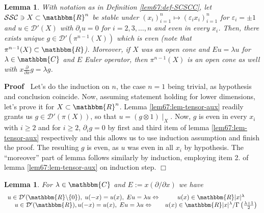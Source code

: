 \documentclass{article}
\newcommand{\assign}{:=}
\renewenvironment{proof}{\noindent\textbf{Proof\ }}{\hspace*{\fill}$\Box$\medskip}
\newtheorem{lemma}[proposition]{Lemma}
\theoremstyle{remark}
\begin{document}
\begin{lemma}
	\label{lem67:lem-tensor}With notation as in Definition \ref{lem67:def-SCSCC}, let $\mathcal{S}\mathcal{S}\mathcal{C} \ni X \subset
  \mathbbm{R}^n$ be stable under $(x_i)_{i = 1}^n \mapsto (\varepsilon_i
  x_i)_{i = 1}^n$ for $\varepsilon_i = \pm 1$ and $u \in \mathcal{D}' (X)$
  with $\partial_i u = 0$ for $i = 2, 3, \ldots, n$ and even in every $x_i$.
  Then, there exists unique $g \in \mathcal{D}' (\pi^{n - 1} (X))$ which is
  even (note that $\pi^{n - 1} (X) \subset \mathbbm{R}$). Moreover, if $X$ was
  an open cone and $E u = \lambda u$ for $\lambda \in \mathbbm{C}$ and $E$
  Euler operator, then $\pi^{n - 1} (X)$ is an open cone as well with $x
  \frac{\partial}{\partial x} g = \lambda g$.
\end{lemma}

\begin{proof}
  Let's do the induction on $n$, the case $n = 1$ being trivial, as hypothesis
  and conclusion coincide. Now, assuming statement holding for lower
  dimensions, let's prove it for $X \subset \mathbbm{R}^n$. Lemma
  \ref{lem67:lem-tensor-aux} readily grants us $g \in \mathcal{D}' (\pi (X))$,
  so that $u = (g \otimes 1) \mid_X$. Now, $g$ is even in every $x_i$ with
  $i \geqslant 2$ and for $i \geqslant 2$, $\partial_i g = 0$ by first and
  third item of lemma \ref{lem67:lem-tensor-aux} respectively and this allows
  us to use induction assumption and finish the proof. The resulting $g$ is
  even, as $u$ was even in all $x_i$ by hypothesis. The ``moreover'' part of
  lemma follows similarly by induction, employing item 2. of lemma
  \ref{lem67:lem-tensor-aux} on induction step.
\end{proof}

\begin{lemma}
  \label{lem67:lem-homogR}For $\lambda \in \mathbbm{C}$ and $E \assign x
  (\partial / \partial x)$ we have
  \[ \begin{array}{cc}
       \begin{array}{c}
         
       \end{array} u \in \mathcal{D}' (\mathbbm{R}\backslash \{ 0 \}), \; u (-
       x) = u (x), \; E u = \lambda u \Leftrightarrow & u (x) \in \mathbbm{R}
       | x |^{\lambda}\\
       u \in \mathcal{D}' (\mathbbm{R}), u (- x) = u (x), \; E u = \lambda u
       \Leftrightarrow & u (x) \in \mathbbm{R} | x |^{\lambda} / \Gamma \left(
       \frac{\lambda + 1}{2} \right)
     \end{array} \]
\end{lemma}
\end{document}
